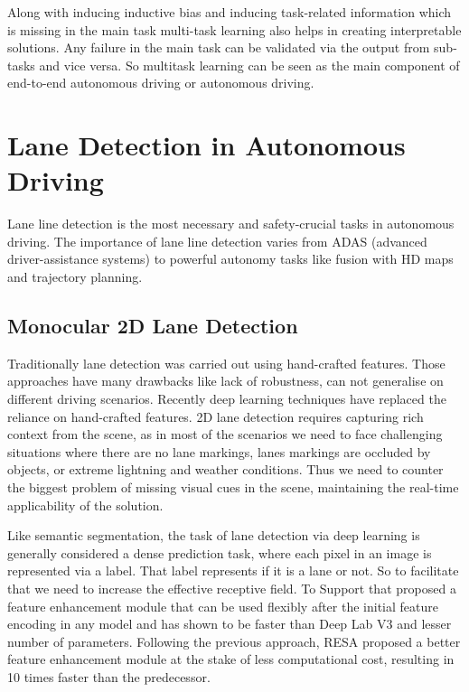     Along with inducing inductive bias and inducing task-related information which is missing in the main task multi-task learning also helps in creating interpretable solutions. Any failure in the main task can be validated via the output from sub-tasks and vice versa. So multitask learning can be seen as the main component of end-to-end autonomous driving or autonomous driving.  

    \section{Lane Detection in Autonomous Driving}
     Lane line detection is the most necessary and safety-crucial tasks in autonomous driving. The importance of lane line detection varies from ADAS (advanced driver-assistance systems) to powerful autonomy tasks like fusion with HD maps and trajectory planning.
        \subsection{Monocular 2D Lane Detection}
        Traditionally lane detection was carried out using hand-crafted features. Those approaches have many drawbacks like lack of robustness, can not generalise on different driving scenarios. Recently deep learning techniques have replaced the reliance on hand-crafted features. 2D lane detection requires capturing rich context from the scene, as in most of the scenarios we need to face challenging situations where there are no lane markings, lanes markings are occluded by objects, or extreme lightning and weather conditions. Thus we need to counter the biggest problem of missing visual cues in the scene, maintaining the real-time applicability of the solution.
        
         Like semantic segmentation, the task of lane detection via deep learning is generally considered a dense prediction task, where each pixel in an image is represented via a label. That label represents if it is a lane or not. So to facilitate that we need to increase the effective receptive field. To Support that \cite{DBLP:journals/corr/abs-1712-06080} proposed a feature enhancement module that can be used flexibly after the initial feature encoding in any model and has shown to be faster than Deep Lab V3 \cite{DBLP:journals/corr/ChenPSA17} and lesser number of parameters. Following the previous approach, RESA \cite{DBLP:journals/corr/abs-2008-13719} proposed a better feature enhancement module at the stake of less computational cost, resulting in 10 times faster than the predecessor. 
        
